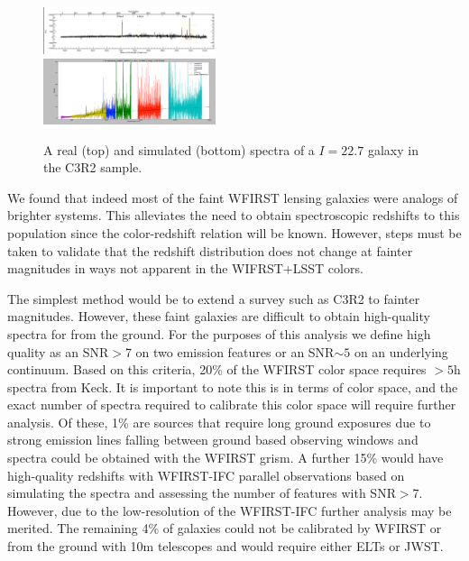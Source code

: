 \begin{figure} 
\centering
 \includegraphics[trim=0cm 0cm 0cm 0cm, clip,width=0.45\textwidth] {./plots/realspec.png}\\
  \includegraphics[trim=0cm 0cm 0cm 0cm, clip,width=0.45\textwidth] {./plots/simspec.png}

\caption{ A real (top) and simulated (bottom) spectra of a $I=22.7$ galaxy in the C3R2 sample.}
\label{fig:SpecSim}
\end{figure}

We found that indeed most of the faint WFIRST lensing galaxies were analogs of brighter systems. This alleviates the need to obtain spectroscopic redshifts to this population since the color-redshift relation will be known.  However, steps must be taken to validate that the redshift distribution does not change at fainter magnitudes in ways not apparent in the WIFRST+LSST colors. 

The simplest method would be to extend a survey such as C3R2 \citep{Masters2017} to fainter magnitudes. However, these faint galaxies are difficult to obtain high-quality spectra for from the ground.  For the purposes of this analysis we define high quality as an SNR$>$7 on two emission features or an SNR$\sim5$ on an underlying continuum.  Based on this criteria, 20\% of the WFIRST color space requires $>5$h spectra from Keck.  It is important to note this is in terms of color space, and the exact number of spectra required to calibrate this color space will require further analysis.   Of these, 1\% are sources that require long ground exposures due to strong emission lines falling between ground based observing windows and spectra could be obtained with the WFIRST grism.  A further 15\% would have high-quality redshifts with WFIRST-IFC parallel observations based on simulating the spectra and assessing the number of features with SNR$>$7.  However, due to the low-resolution of the WFIRST-IFC further analysis may be merited.   The remaining 4\% of galaxies could not be calibrated by WFIRST or from the ground with 10m telescopes and would require either ELTs or JWST.


